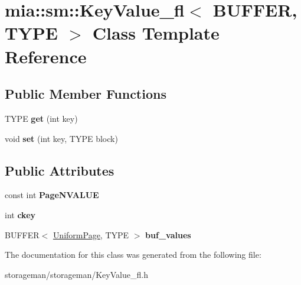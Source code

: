 \hypertarget{classmia_1_1sm_1_1_key_value__fl}{\section{mia\-:\-:sm\-:\-:Key\-Value\-\_\-fl$<$ B\-U\-F\-F\-E\-R, T\-Y\-P\-E $>$ Class Template Reference}
\label{classmia_1_1sm_1_1_key_value__fl}
}
\subsection*{Public Member Functions}
\begin{DoxyCompactItemize}
\item 
\hypertarget{classmia_1_1sm_1_1_key_value__fl_a80ee244393b3e2fbed2c5ae5070963c4}{T\-Y\-P\-E {\bfseries get} (int key)}\label{classmia_1_1sm_1_1_key_value__fl_a80ee244393b3e2fbed2c5ae5070963c4}

\item 
\hypertarget{classmia_1_1sm_1_1_key_value__fl_a7088d4e1595a09f06e8f9046d84e8e18}{void {\bfseries set} (int key, T\-Y\-P\-E block)}\label{classmia_1_1sm_1_1_key_value__fl_a7088d4e1595a09f06e8f9046d84e8e18}

\end{DoxyCompactItemize}
\subsection*{Public Attributes}
\begin{DoxyCompactItemize}
\item 
\hypertarget{classmia_1_1sm_1_1_key_value__fl_a6259565d4319cf459c8d9df78c385b23}{const int {\bfseries Page\-N\-V\-A\-L\-U\-E}}\label{classmia_1_1sm_1_1_key_value__fl_a6259565d4319cf459c8d9df78c385b23}

\item 
\hypertarget{classmia_1_1sm_1_1_key_value__fl_a8238fc95f7391378a60fd8b2f3cf1f4b}{int {\bfseries ckey}}\label{classmia_1_1sm_1_1_key_value__fl_a8238fc95f7391378a60fd8b2f3cf1f4b}

\item 
\hypertarget{classmia_1_1sm_1_1_key_value__fl_adc95a4da9b2a68621d8a7858031091e5}{B\-U\-F\-F\-E\-R$<$ \hyperlink{classmia_1_1sm_1_1_uniform_page}{Uniform\-Page}, T\-Y\-P\-E $>$ {\bfseries buf\-\_\-values}}\label{classmia_1_1sm_1_1_key_value__fl_adc95a4da9b2a68621d8a7858031091e5}

\end{DoxyCompactItemize}


The documentation for this class was generated from the following file\-:\begin{DoxyCompactItemize}
\item 
storageman/storageman/Key\-Value\-\_\-fl.\-h\end{DoxyCompactItemize}
